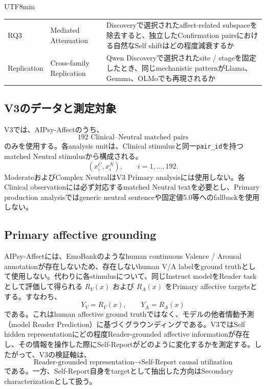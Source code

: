 \documentclass{article} %
\begin{document}
\begin{CJK*}{UTF8}{min}
\begin{table}[htbp]
\begin{tabularx}{\linewidth}{
@{}
>{\raggedright\arraybackslash}p{1.5cm}
>{\raggedright\arraybackslash}p{3.1cm}
>{\raggedright\arraybackslash}X
@{}
}
RQ3 &
Mediated Attenuation &
Discoveryで選択されたaffect-related subspaceを除去すると、独立したConfirmation pairsにおける自然なSelf shiftはどの程度減衰するか \\

Replication &
Cross-family Replication &
Qwen Discoveryで選択されたsite / stageを固定したとき、同じmechanistic patternがLlama、Gemma、OLMoでも再現されるか \\
\bottomrule
\end{tabularx}
\end{table}

\subsection{V3のデータと測定対象}

V3では、AIPsy-Affectのうち、
\[
192\text{ Clinical--Neutral matched pairs}
\]
のみを使用する。各analysis unitは、Clinical stimulusと同一\texttt{pair\_id}を持つmatched Neutral stimulusから構成される。
\[
(x_i^{C},x_i^{N}),
\qquad
i=1,\ldots,192.
\]
ModerateおよびComplex NeutralはV3 Primary analysisには使用しない。各Clinical observationには必ず対応するmatched Neutral textを必要とし、Primary production analysisではgeneric neutral sentenceや固定値5.0等へのfallbackを使用しない。


\subsection{Primary affective grounding}

AIPsy-Affectには、EmoBankのようなhuman continuous Valence / Arousal annotationが存在しないため、存在しないhuman V/A labelをground truthとして使用しない。代わりに各stimulusについて、同じInstruct modelをReader taskとして評価して得られる $R_V(x)$ および $R_A(x)$ をPrimary affective targetsとする。すなわち、
\[
Y_V = R_V(x), \qquad Y_A = R_A(x)
\]
である。これはhuman affective ground truthではなく、モデルの他者情動予測（model Reader Prediction）に基づくグラウンディングである。V3ではSelf hidden representationにどの程度Reader-grounded affective informationが存在し、その情報を操作した際にSelf-Reportがどのように変化するかを測定する。したがって、V3の検証軸は、
\[
\text{Reader-grounded representation} \rightarrow \text{Self-Report causal utilization}
\]
である。一方、Self-Report自身をtargetとして抽出した方向はSecondary characterizationとして扱う。



\end{CJK*}
\end{document}
